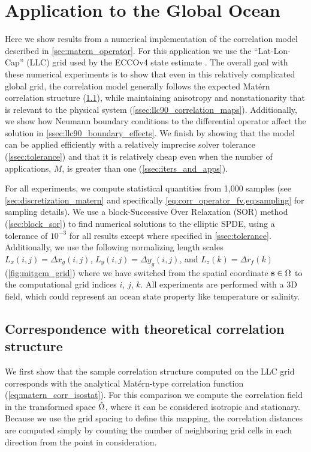 \section{Application to the Global Ocean}
\label{sec:llc90}

Here we show results from a numerical implementation of the correlation model
described in \cref{sec:matern_operator}.
For this application we use the ``Lat-Lon-Cap'' (LLC) grid used by the ECCOv4
state estimate \citep[see their Section 2 of][for a complete description of the grid]{forgetECCOv4}.
The overall goal with these numerical experiments is to show that even in this
relatively complicated global grid, the
correlation model generally follows the expected Mat\'ern correlation structure
(\cref{ssec:llc90_correlations}), while maintaining
anisotropy and nonstationarity that is relevant to the physical system
(\cref{ssec:llc90_correlation_maps}).
Additionally, we show how Neumann boundary conditions to the differential
operator affect the solution in \cref{ssec:llc90_boundary_effects}.
We finish
by showing that the model can be applied efficiently with a relatively imprecise
solver tolerance (\cref{ssec:tolerance}) and that it is relatively cheap even
when the number of applications, $M$, is greater than one
(\cref{ssec:iters_and_apps}).

For all experiments, we compute statistical quantities from 1,000 samples
(see \cref{sec:discretization_matern} and specifically
\cref{eq:corr_operator_fv,eq:sampling} for sampling details).
We use a block-Successive Over Relaxation (SOR) method (\cref{sec:block_sor}) to find numerical
solutions to the elliptic SPDE, using a tolerance of $10^{-3}$ for all results
except where specified in \cref{ssec:tolerance}.
Additionally, we use the following normalizing length scales
$L_x(i,j) = \Delta x_g(i,j)$, $L_y(i,j) = \Delta y_g(i,j)$,
and $L_z(k) = \Delta r_f(k)$ (\cref{fig:mitgcm_grid}) where we have switched
from the spatial coordinate $\mathbf{s}\in\Omega$ to the computational grid indices $i$, $j$, $k$.
All experiments are performed with a 3D field, which could represent an ocean
state property like temperature or salinity.

\subsection{Correspondence with theoretical correlation structure}
\label{ssec:llc90_correlations}

We first show that the sample correlation structure computed on the LLC
grid corresponds with the analytical Mat\'ern-type correlation function
(\cref{eq:matern_corr_isostat}).
For this comparison we compute the correlation field in the transformed space
$\hat{\Omega}$, where it can be considered isotropic and stationary.
Because we use the grid spacing to define this mapping, the correlation
distances are computed simply by counting the number of neighboring grid cells in each
direction from the point in consideration.

